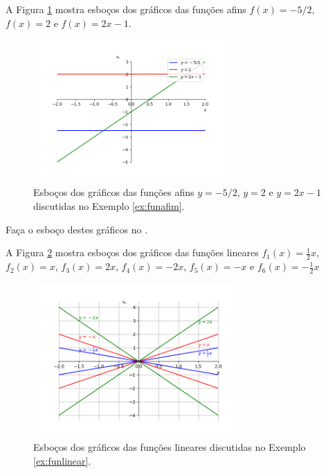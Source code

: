\documentclass[../main.tex]{subfiles}
\begin{document}
\begin{ex}\label{ex:funafim}
  A Figura \ref{fig:ex_funafim} mostra esboços dos gráficos das funções afins $f(x)=-5/2$, $f(x)=2$ e $f(x)=2x-1$.
    \begin{figure}[H]
    \centering
    \includegraphics[width=0.65\textwidth]{fig_func/fig_ex_funafim}
    \caption{Esboços dos gráficos das funções afins $y=-5/2$, $y=2$ e $y=2x-1$ discutidas no Exemplo \ref{ex:funafim}.}
    \label{fig:ex_funafim}
  \end{figure}

{\normalfont {}}
\dica Faça o esboço destes gráficos no \geogebra.
\end{ex}

\begin{ex}\label{ex:funlinear}
  A Figura \ref{fig:ex_funlinear} mostra esboços dos gráficos das funções lineares $f_1(x)=\frac{1}{2}x$, $f_2(x) = x$, $f_3(x) = 2x$, $f_4(x)=-2x$, $f_5(x)=-x$ e $f_6(x)=-\frac{1}{2}x$
    \begin{figure}[H]
    \centering
    \includegraphics[width=0.7\textwidth]{fig_func/fig_ex_funlinear}
    \caption{Esboços dos gráficos das funções lineares discutidas no Exemplo \ref{ex:funlinear}.}
    \label{fig:ex_funlinear}
  \end{figure}
\end{ex}
\end{document}

